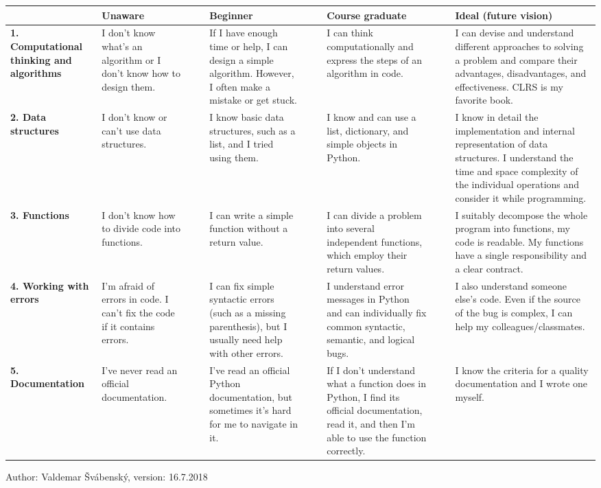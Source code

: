 \documentclass{article}
\begin{document}
\begin{table}[H]
\centering
\begin{tabular}{|p{3.2cm}|p{2.5cm}|l|l|p{4.5cm}|l|l|p{4.5cm}|l|l|p{4.5cm}|}
\hline
& \textbf{Unaware} & & & \textbf{Beginner} & & & \textbf{Course graduate} & & & \textbf{Ideal (future vision)} \\ \hline

\textbf{1. Computational thinking and algorithms}
& I don't know what's an algorithm or I don't know how to design them. & &
& If I have enough time or help, I can design a simple algorithm. However, I often make a mistake or get stuck. & & 
& I can think computationally and express the steps of an algorithm in code. & & 
& I can devise and understand different approaches to solving a problem and compare their advantages, disadvantages, and effectiveness. CLRS is my favorite book. \\ \hline

\textbf{2. Data structures}
& I don't know or can't use data structures. & &
& I know basic data structures, such as a list, and I tried using them. & & 
& I know and can use a list, dictionary, and simple objects in Python. & & 
& I know in detail the implementation and internal representation of data structures. I understand the time and space complexity of the individual operations and consider it while programming. \\ \hline

\textbf{3. Functions}
& I don't know how to divide code into functions. & &
& I can write a simple function without a return value. & & 
& I can divide a problem into several independent functions, which employ their return values. & & 
& I suitably decompose the whole program into functions, my code is readable. My functions have a single responsibility and a clear contract. \\ \hline

\textbf{4. Working with errors}
& I'm afraid of errors in code. I can't fix the code if it contains errors. & &
& I can fix simple syntactic errors (such as a missing parenthesis), but I usually need help with other errors. & & 
& I understand error messages in Python and can individually fix common syntactic, semantic, and logical bugs. & & 
& I also understand someone else's code. Even if the source of the bug is complex, I can help my colleagues/classmates. \\ \hline

\textbf{5. Documentation}
& I've never read an official documentation. & &
& I've read an official Python documentation, but sometimes it's hard for me to navigate in it. & & 
& If I don't understand what a function does in Python, I find its official documentation, read it, and then I'm able to use the function correctly. & & 
& I know the criteria for a quality documentation and I wrote one myself. \\ \hline
\end{tabular}
\end{table}

\begin{center}
\small Author: Valdemar Švábenský, version: 16.7.2018
\end{center}
\end{document}

